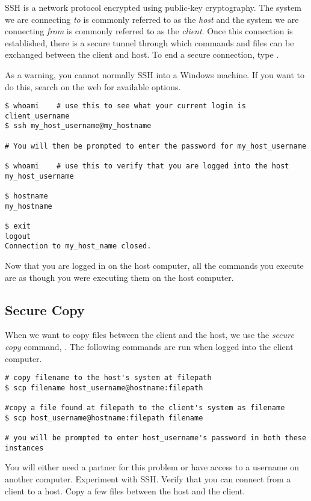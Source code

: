 SSH is a network protocol encrypted using public-key cryptography.
The system we are connecting \emph{to} is commonly referred to as the \emph{host} and the system we are connecting \emph{from} is commonly referred to as the \emph{client}.
Once this connection is established, there is a secure tunnel through which commands and files can be exchanged between the client and host.
To end a secure connection, type .

As a warning, you cannot normally SSH into a Windows machine.
If you want to do this, search on the web for available options.

\begin{lstlisting}
$ whoami    # use this to see what your current login is
client_username
$ ssh my_host_username@my_hostname

# You will then be prompted to enter the password for my_host_username

$ whoami    # use this to verify that you are logged into the host
my_host_username

$ hostname
my_hostname

$ exit
logout
Connection to my_host_name closed.
\end{lstlisting}

Now that you are logged in on the host computer, all the commands you execute are as though you were executing them on the host computer.

\subsection*{Secure Copy} %

When we want to copy files between the client and the host, we use the \emph{secure copy} command, .
The following commands are run when logged into the client computer.

\begin{lstlisting}
# copy filename to the host's system at filepath
$ scp filename host_username@hostname:filepath

#copy a file found at filepath to the client's system as filename
$ scp host_username@hostname:filepath filename

# you will be prompted to enter host_username's password in both these instances
\end{lstlisting}

\begin{problem}
You will either need a partner for this problem or have access to a username on another computer.
Experiment with SSH. Verify that you can connect from a client to a host.
Copy a few files between the host and the client.
\end{problem}


